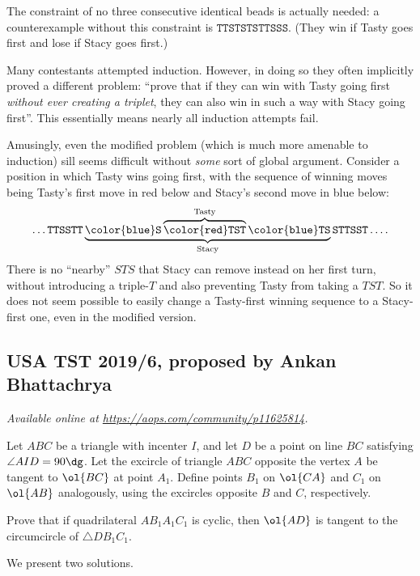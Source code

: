 \documentclass[11pt]{scrartcl}
\begin{document}
\begin{remark*}
  The constraint of no three consecutive identical beads is actually
  needed: a counterexample without this constraint is
  $\mathtt{TTSTSTSTTSSS}$.
  (They win if Tasty goes first and lose if Stacy goes first.)
\end{remark*}

\begin{remark*}
  Many contestants attempted induction.
  However, in doing so they often implicitly proved
  a different problem: ``prove that if they can win
  with Tasty going first \emph{without ever creating a triplet},
  they can also win in such a way with Stacy going first''.
  This essentially means nearly all induction attempts fail.

  Amusingly, even the modified problem
  (which is much more amenable to induction)
  sill seems difficult without \emph{some} sort of global argument.
  Consider a position in which Tasty wins going first,
  with the sequence of winning moves being Tasty's first move in red
  below and Stacy's second move in blue below:
  \[
    \dots \mathtt{TTSSTT}
    \underbrace{\mathtt{\color{blue}S}
    \overbrace{\mathtt{\color{red}TST}}^{\text{Tasty}}
    \mathtt{\color{blue}TS}}_{\text{Stacy}}
    \mathtt{STTSST} \dots.
  \]
  There is no ``nearby'' $STS$ that Stacy can remove
  instead on her first turn,
  without introducing a triple-$T$ and also
  preventing Tasty from taking a $TST$.
  So it does not seem possible to easily change
  a Tasty-first winning sequence to a Stacy-first one,
  even in the modified version.
\end{remark*}
\pagebreak

\subsection{USA TST 2019/6, proposed by Ankan Bhattachrya}
\textsl{Available online at \url{https://aops.com/community/p11625814}.}
\begin{mdframed}[style=mdpurplebox,frametitle={Problem statement}]
Let $ABC$ be a triangle with incenter $I$,
and let $D$ be a point on line $BC$ satisfying $\angle AID = 90\dg$.
Let the excircle of triangle $ABC$ opposite the vertex $A$
be tangent to $\ol{BC}$ at point $A_1$.
Define points $B_1$ on $\ol{CA}$ and $C_1$ on $\ol{AB}$ analogously,
using the excircles opposite $B$ and $C$, respectively.

Prove that if quadrilateral $AB_1A_1C_1$ is cyclic,
then $\ol{AD}$ is tangent to the circumcircle of $\triangle DB_1C_1$.
\end{mdframed}
We present two solutions.
\end{document}
